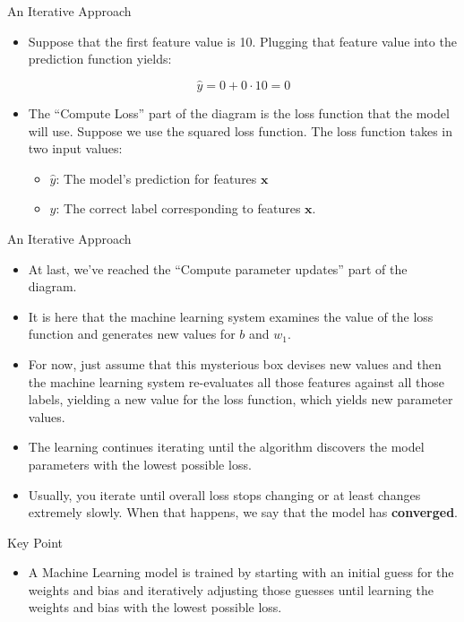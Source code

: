 \documentclass{beamer}
\begin{document}
\begin{frame}{An Iterative Approach}
\begin{itemize}
    \item Suppose that the first feature value is 10. Plugging that feature value into the prediction function yields:

    $$ \hat{y} = 0 + 0 \cdot 10 = 0 $$

    \item The ``Compute Loss'' part of the diagram is the loss function that the model will use. Suppose we use the squared loss function. The loss function takes in two input values:
    \begin{itemize}
        \item $\hat{y}$: The model's prediction for features $\boldsymbol{x}$
        \item $y$: The correct label corresponding to features $\boldsymbol{x}$.
    \end{itemize}
\end{itemize}
\end{frame}

\begin{frame}{An Iterative Approach}
\begin{itemize}
    \item At last, we've reached the ``Compute parameter updates'' part of the diagram. 
    \item It is here that the machine learning system examines the value of the loss function and generates new values for $b$ and $w_1$. 
    \item For now, just assume that this mysterious box devises new values and then the machine learning system re-evaluates all those features against all those labels, yielding a new value for the loss function, which yields new parameter values. 
    \item The learning continues iterating until the algorithm discovers the model parameters with the lowest possible loss. 
    \item Usually, you iterate until overall loss stops changing or at least changes extremely slowly. When that happens, we say that the model has {\bf converged}.
\end{itemize}
\end{frame}

\begin{frame}{Key Point}
\begin{itemize}
    \item A Machine Learning model is trained by starting with an initial guess for the weights and bias and iteratively adjusting those guesses until learning the weights and bias with the lowest possible loss.
\end{itemize}
\end{frame}
\end{document}

